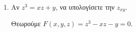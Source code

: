 





\begin{enumerate}
    \item Αν $ z^{3}=xz+y $, να υπολογίσετε την $ z_{xy} $.
        \begin{solution}
            Θεωρούμε $ F(x,y,z)=z^{3}-xz-y=0 $.
        \end{solution}
\end{enumerate}


